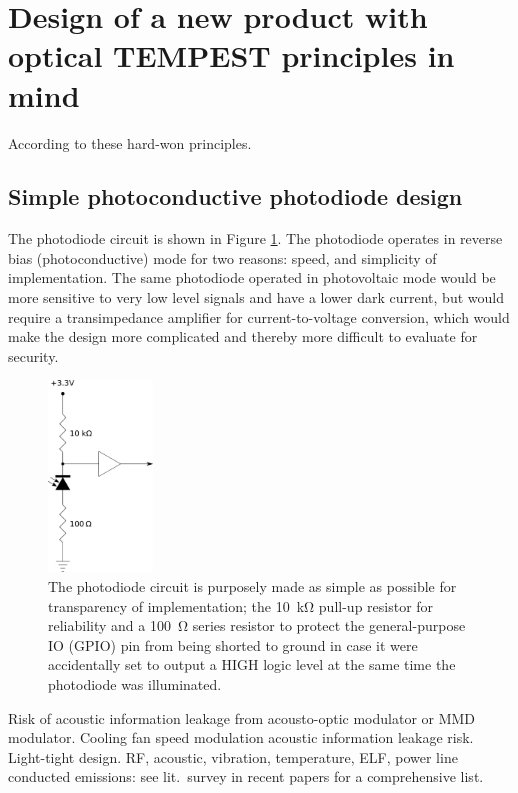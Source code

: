 \documentclass[conference]{IEEEtran}
\begin{document}
\section{Design of a new product with optical TEMPEST principles
in mind}

According to these hard-won principles.

\subsection{Simple photoconductive photodiode design}

The photodiode circuit is shown in Figure \ref{figure:photodiode_pullup}.
The photodiode operates in reverse bias (photoconductive) mode for two
reasons: speed, and simplicity of implementation. The same photodiode
operated in photovoltaic mode would be more sensitive to very low level
signals and have a lower dark current, but would require a transimpedance
amplifier for current-to-voltage conversion, which would make the design
more complicated and thereby more difficult to evaluate for security.

\begin{figure}[!t]
    \centering
	\includegraphics[height=2in]{graphics/photodiode_pullup_and_GPIO_protection.png}
	\caption{The photodiode circuit is purposely made as simple as possible
        for transparency of implementation; the \SI{10}{\kilo\ohm} pull-up
        resistor for reliability and a \SI{100}{\ohm} series resistor to
        protect the general-purpose IO (GPIO) pin from being shorted to
        ground in case it were accidentally set to output a HIGH logic level
        at the same time the photodiode was illuminated.}
	\label{figure:photodiode_pullup}
\end{figure}


Risk of acoustic information leakage from acousto-optic modulator or MMD
modulator. Cooling fan speed modulation acoustic information leakage risk.
Light-tight design. RF, acoustic, vibration, temperature, ELF, power line
conducted emissions: see lit.\ survey in recent papers for a comprehensive
list.
\end{document}
